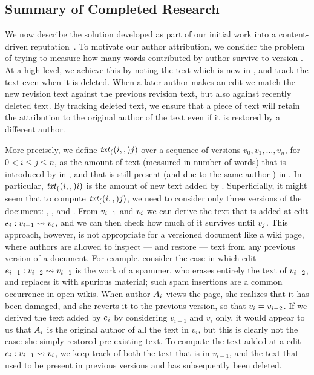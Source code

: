 \subsection{Summary of Completed Research}

We now describe the solution
developed as part of our initial work into a
content-driven reputation~\cite{Adler2007}.
To motivate our author attribution, we consider the problem of
trying to measure how many words contributed by author 
survive to version .
At a high-level, we achieve this by noting the text which
is new in , and track the text even when it is deleted. 
When a later author makes an edit we match the new revision text
against the previous revision text, but also against recently
deleted text.
By tracking deleted text, we ensure that a piece of text
will retain the attribution to the original author of the text
even if it is restored by a different author.

More precisely,
we define $\mathit{txt}_{(}(i,,)j)$
over a
sequence of versions $v_0, v_1, \ldots, v_n$,
for $0 < i \leq j \leq n$, as the amount of text
(measured in number of words) that is introduced
by  in ,
and that is still present (and due to the same author )
in .
In particular, $\mathit{txt}_{(}(i,,)i)$ is the amount of new text added by .
Superficially, it might seem that to compute $\mathit{txt}_{(}(i,,)j)$, we need to
consider only three versions of the document: ,
, and
.
From $v_{i-1}$ and $v_{i}$
we can derive the text that is added at edit
$e_{i}: v_{i-1} \rightsquigarrow v_{i}$,
and we can then check how much of it
survives until $v_{j}$.
This approach, however, is not appropriate for a versioned document
like a wiki page, where authors are allowed to inspect --- and restore
--- text from any previous version of a document.
For example, consider the case in which edit
$e_{i-1}: v_{i-2} \rightsquigarrow v_{i-1}$ is the work
of a spammer, who erases entirely the text of $v_{i-2}$, and replaces
it with spurious material; such spam insertions are a common
occurrence in open wikis.
When author $A_{i}$ views the page, she realizes that it has been damaged,
and she reverts it to the previous version, so that
$v_{i} = v_{i-2}$.
If we derived the text added by $e_{i}$ by considering $v_{i-1}$ and
$v_i$ only, it would appear to us that $A_{i}$ is the original author of
all the text in $v_i$, but this is clearly not the case: she simply
restored pre-existing text.
To compute the text added at a edit $e_{i}: v_{i-1} \rightsquigarrow v_i$,
we keep track of both the text that is in $v_{i-1}$, and the text that used to
be present in previous versions and has subsequently been deleted.

